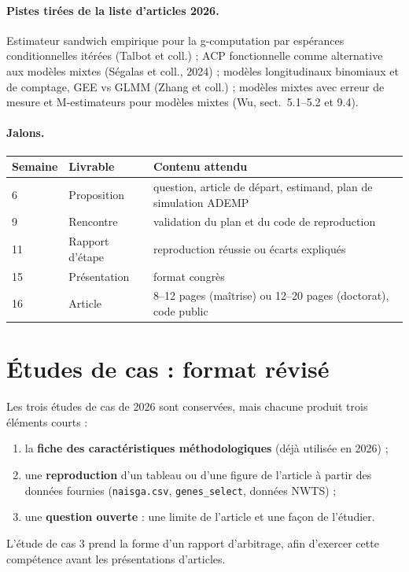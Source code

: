 \documentclass[11pt]{article}
\begin{document}
\paragraph{Pistes tirées de la liste d'articles 2026.}
Estimateur sandwich empirique pour la g-computation par espérances conditionnelles itérées
(Talbot et coll.) ; ACP fonctionnelle comme alternative aux modèles mixtes (Ségalas et coll., 2024) ;
modèles longitudinaux binomiaux et de comptage, GEE vs GLMM (Zhang et coll.) ;
modèles mixtes avec erreur de mesure et M-estimateurs pour modèles mixtes (Wu, sect.~5.1--5.2 et 9.4).

\paragraph{Jalons.}
\begin{center}
\begin{tabular}{@{}lll@{}}
\toprule
Semaine & Livrable & Contenu attendu\\
\midrule
6  & Proposition & question, article de départ, estimand, plan de simulation ADEMP\\
9  & Rencontre   & validation du plan et du code de reproduction\\
11 & Rapport d'étape & reproduction réussie ou écarts expliqués\\
15 & Présentation & format congrès\\
16 & Article     & 8--12 pages (maîtrise) ou 12--20 pages (doctorat), code public\\
\bottomrule
\end{tabular}
\end{center}

\section{Études de cas : format révisé}

Les trois études de cas de 2026 sont conservées, mais chacune produit trois éléments courts :
\begin{enumerate}
  \item la \textbf{fiche des caractéristiques méthodologiques} (déjà utilisée en 2026) ;
  \item une \textbf{reproduction} d'un tableau ou d'une figure de l'article à partir des données
        fournies (\texttt{naisga.csv}, \texttt{genes\_select}, données NWTS) ;
  \item une \textbf{question ouverte} : une limite de l'article et une façon de l'étudier.
\end{enumerate}
L'étude de cas 3 prend la forme d'un rapport d'arbitrage, afin d'exercer cette compétence avant
les présentations d'articles.
\end{document}
